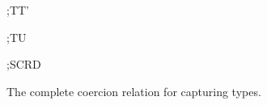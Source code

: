 \documentclass[acmsmall,screen,nonacm]{acmart}
\begin{document}
\begin{figure}[H]
\ContinuedFloat
{}
\noindent
\begin{minipage}[t]{0.22\linewidth}
\end{minipage}\hfill
\begin{minipage}[t]{0.27\linewidth}
  {\Omega;\sigma\vdash T\tcoerce T'}
\end{minipage}\hfill
\begin{minipage}[t]{0.20\linewidth}
  {\Omega;\sigma\vdash T\tcoerce U}
\end{minipage}\hfill
\begin{minipage}[t]{0.27\linewidth}
  {\Omega;\sigma\vdash S\capt C\tcoerce R\capt D}
\end{minipage}

\caption{The complete coercion relation for capturing types.}
\label{fig:type-coercion}
\end{figure}
\end{document}
